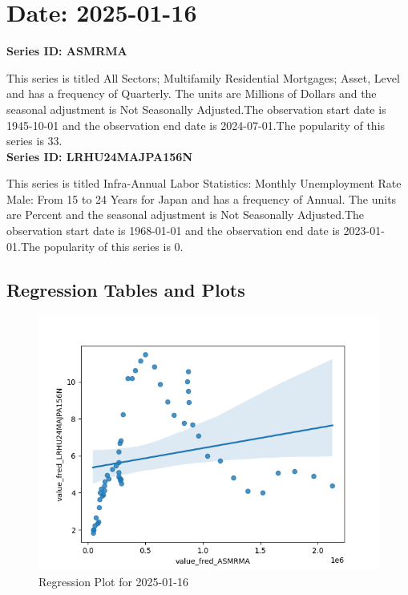 \section{Date: 2025-01-16}
\noindent \textbf{Series ID: ASMRMA} 

\noindent This series is titled All Sectors; Multifamily Residential Mortgages; Asset, Level and has a frequency of Quarterly. The units are Millions of Dollars and the seasonal adjustment is Not Seasonally Adjusted.The observation start date is 1945-10-01 and the observation end date is 2024-07-01.The popularity of this series is 33. \\ 

\noindent \textbf{Series ID: LRHU24MAJPA156N} 

\noindent This series is titled Infra-Annual Labor Statistics: Monthly Unemployment Rate Male: From 15 to 24 Years for Japan and has a frequency of Annual. The units are Percent and the seasonal adjustment is Not Seasonally Adjusted.The observation start date is 1968-01-01 and the observation end date is 2023-01-01.The popularity of this series is 0. \\ 

\subsection{Regression Tables and Plots}


\begin{figure}
\centering
\includegraphics[scale = 0.9]{plots/plot_2025-01-16.png}
\caption{Regression Plot for 2025-01-16}
\end{figure}
\newpage
